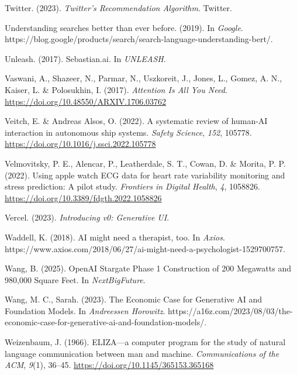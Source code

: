 \documentclass[
  letterpaper,
  DIV=11,
  numbers=noendperiod]{scrartcl}
\newlength{\cslhangindent}
\newenvironment{CSLReferences}[2] %
 {\begin{list}{}{%
  \setlength{\itemindent}{0pt}
  \setlength{\leftmargin}{0pt}
  \setlength{\parsep}{0pt}
  \ifodd #1
   \setlength{\leftmargin}{\cslhangindent}
   \setlength{\itemindent}{-1\cslhangindent}
  \fi
  \setlength{\itemsep}{#2\baselineskip}}}
 {\end{list}}
\begin{document}
\begin{CSLReferences}{1}{0}
Twitter. (2023). \emph{Twitter's {Recommendation Algorithm}}. Twitter.

Understanding searches better than ever before. (2019). In
\emph{Google}.
https://blog.google/products/search/search-language-understanding-bert/.

Unleash. (2017). Sebastian.ai. In \emph{UNLEASH}.

Vaswani, A., Shazeer, N., Parmar, N., Uszkoreit, J., Jones, L., Gomez,
A. N., Kaiser, L. \& Polosukhin, I. (2017). \emph{Attention {Is All You
Need}}. \url{https://doi.org/10.48550/ARXIV.1706.03762}

Veitch, E. \& Andreas Alsos, O. (2022). A systematic review of
human-{AI} interaction in autonomous ship systems. \emph{Safety
Science}, \emph{152}, 105778.
\url{https://doi.org/10.1016/j.ssci.2022.105778}

Velmovitsky, P. E., Alencar, P., Leatherdale, S. T., Cowan, D. \&
Morita, P. P. (2022). Using apple watch {ECG} data for heart rate
variability monitoring and stress prediction: {A} pilot study.
\emph{Frontiers in Digital Health}, \emph{4}, 1058826.
\url{https://doi.org/10.3389/fdgth.2022.1058826}

Vercel. (2023). \emph{Introducing v0: {Generative UI}}.

Waddell, K. (2018). {AI} might need a therapist, too. In \emph{Axios}.
https://www.axios.com/2018/06/27/ai-might-need-a-psychologist-1529700757.

Wang, B. (2025). {OpenAI Stargate Phase} 1 {Construction} of 200
{Megawatts} and 980,000 {Square Feet}. In \emph{NextBigFuture}.

Wang, M. C., Sarah. (2023). The {Economic Case} for {Generative AI} and
{Foundation Models}. In \emph{Andreessen Horowitz}.
https://a16z.com/2023/08/03/the-economic-case-for-generative-ai-and-foundation-models/.

Weizenbaum, J. (1966). {ELIZA}---a computer program for the study of
natural language communication between man and machine.
\emph{Communications of the ACM}, \emph{9}(1), 36--45.
\url{https://doi.org/10.1145/365153.365168}


\end{CSLReferences}
\end{document}
